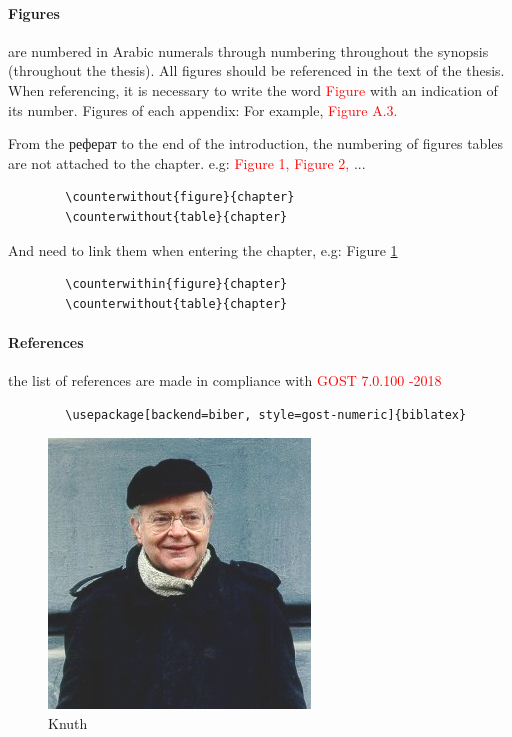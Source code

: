 \paragraph*{Figures} are numbered in Arabic numerals through numbering throughout the synopsis (throughout the thesis).
All figures should be referenced in the text of the thesis. When referencing, it is necessary to write the word \textcolor{red}{Figure} with an indication of its number.
Figures of each appendix: For example, \textcolor{red}{Figure A.3.}

From the реферат to the end of the introduction, the numbering of figures  tables are not attached to the chapter. e.g: \textcolor{red}{Figure 1, Figure 2,} ...
{
	\color{blue}
	\begin{verbatim}
		\counterwithout{figure}{chapter}
		\counterwithout{table}{chapter}
	\end{verbatim}
}
And need to link them when entering the chapter, e.g: Figure \ref{fig:3_1}
{
	\color{blue}
	\begin{verbatim}
		\counterwithin{figure}{chapter}			
		\counterwithout{table}{chapter}	
	\end{verbatim}
}

\paragraph{References} the list of references are made in compliance with \textcolor{red}{GOST 7.0.100 -2018}
{
	\color{blue}
	\begin{verbatim}
		\usepackage[backend=biber, style=gost-numeric]{biblatex}
	\end{verbatim}
}
\begin{figure}
	\centering
	\includegraphics[width=0.4\linewidth]{images/knuth}
	\caption{Knuth}
	\label{fig:3_1}
\end{figure}

